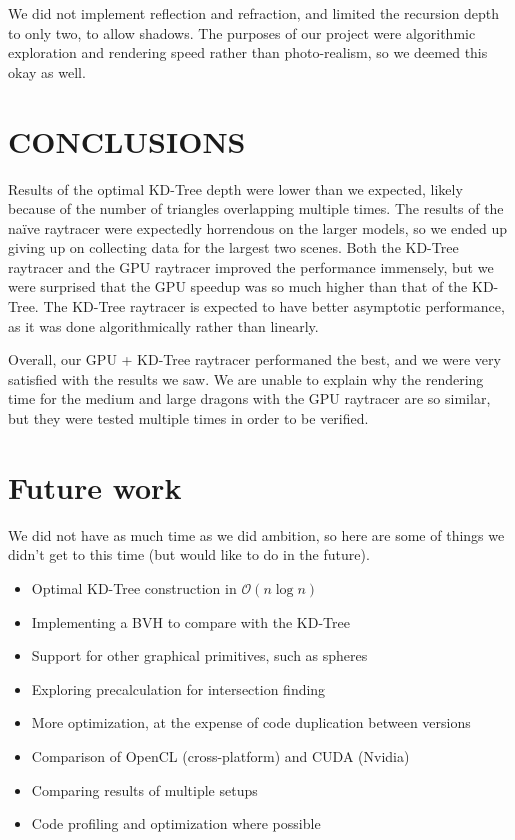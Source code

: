 \documentclass[letterpaper, 10 pt, conference]{ieeeconf}  %
\begin{document}
We did not implement reflection and refraction, and limited the recursion depth to only two, to allow shadows. The purposes of our project were algorithmic exploration and rendering speed rather than photo-realism, so we deemed this okay as well.
\section{CONCLUSIONS}
Results of the optimal KD-Tree depth were lower than we expected, likely because of the number of triangles overlapping multiple times. The results of the naïve raytracer were expectedly horrendous on the larger models, so we ended up giving up on collecting data for the largest two scenes. Both the KD-Tree raytracer and the GPU raytracer improved the performance immensely, but we were surprised that the GPU speedup was so much higher than that of the KD-Tree. The KD-Tree raytracer is expected to have better asymptotic performance, as it was done algorithmically rather than linearly.

Overall, our GPU + KD-Tree raytracer performaned the best, and we were very satisfied with the results we saw. We are unable to explain why the rendering time for the medium and large dragons with the GPU raytracer are so similar, but they were tested multiple times in order to be verified.

\addtolength{\textheight}{-12cm}   %


\section*{Future work}
We did not have as much time as we did ambition, so here are some of things we didn't get to this time (but would like to do in the future).
\begin{itemize}
\item Optimal KD-Tree construction in $\mathcal{O}(n\log{n})$
\item Implementing a BVH to compare with the KD-Tree
\item Support for other graphical primitives, such as spheres
\item Exploring precalculation for intersection finding
\item More optimization, at the expense of code duplication between versions
\item Comparison of OpenCL (cross-platform) and CUDA (Nvidia)
\item Comparing results of multiple setups
\item Code profiling and optimization where possible
\end{itemize}
\end{document}

